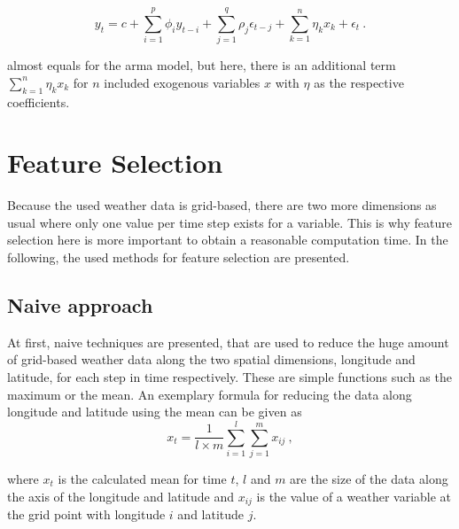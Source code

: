 \begin{equation}
y_t = c+\sum_{i=1}^{p}\phi_iy_{t-i}+\sum_{j=1}^{q}\rho_j\epsilon_{t-j}+\sum_{k=1}^{n}\eta_kx_k+\epsilon_t~.
\label{eq:armax}
\end{equation}

 almost equals  for the \gls{arma} model, but here, there is an additional term $\sum_{k=1}^{n}\eta_kx_k$ for $n$ included exogenous variables $x$ with $\eta$ as the respective coefficients.

%

\section{Feature Selection}
\label{sec:featsel}

Because the used weather data is grid-based, there are two more dimensions as usual where only one value per time step exists for a variable. This is why feature selection here is more important to obtain a reasonable computation time. In the following, the used methods for feature selection are presented.\\

\subsection*{Naive approach}

At first, naive techniques are presented, that are used to reduce the huge amount of grid-based weather data along the two spatial dimensions, longitude and latitude, for each step in time respectively. These are simple functions such as the maximum or the mean. An exemplary formula for reducing the data along longitude and latitude using the mean can be given as\\

\begin{equation}
x_t = \frac{1}{l \times m} \sum_{i=1}^{l}\sum_{j=1}^{m}x_{ij}~,
\end{equation}

where $x_t$ is the calculated mean for time $t$, $l$ and $m$ are the size of the data along the axis of the longitude and latitude and $x_{ij}$ is the value of a weather variable at the grid point with longitude $i$ and latitude $j$.

